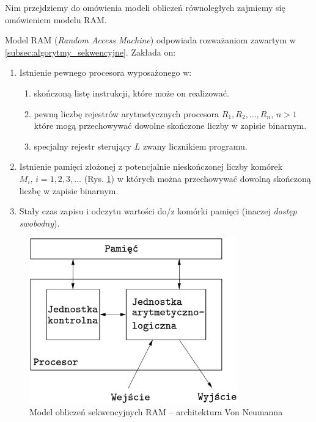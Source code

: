 Nim przejdziemy do omówienia modeli obliczeń równoległych zajmiemy się omówieniem modelu RAM. 


Model RAM (\emph{Random Access Machine}) odpowiada rozważaniom zawartym w \ref{subsec:algorytmy_sekwencyjne}. Zakłada on:
\begin{enumerate}
\item{Istnienie pewnego procesora wyposażonego w:
\begin{enumerate}
\item skończoną listę instrukcji, które może on realizować.
\item pewną liczbę rejestrów arytmetycznych procesora \(R_1, R_2, \dots, R_n\), \(n>1\) które mogą przechowywać dowolne skończone liczby w zapisie binarnym.
\item specjalny rejestr sterujący \(L\) zwany licznikiem programu.
\end{enumerate}}
\item Istnienie pamięci złożonej z potencjalnie nieskończonej liczby komórek \(M_i, \, i=1, 2, 3, \dots\) (Rys. \ref{fig:neumann}) w których można przechowywać dowolną skończoną liczbę w zapisie binarnym.
\item Stały czas zapisu i odczytu wartości do/z komórki pamięci (inaczej \emph{dostęp swobodny}).

\end{enumerate}


\begin{figure}[h]
\centering
\includegraphics[width=9cm]{images/Rys_Neumann.eps}

\caption{Model obliczeń sekwencyjnych RAM – architektura Von Neumanna}
\label{fig:neumann}
\end{figure}



